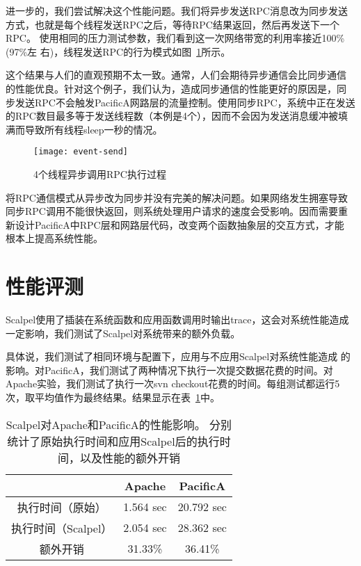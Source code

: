 进一步的，我们尝试解决这个性能问题。我们将异步发送RPC消息改为同步发送
方式，也就是每个线程发送RPC之后，等待RPC结果返回，然后再发送下一个RPC。
使用相同的压力测试参数，我们看到这一次网络带宽的利用率接近100\%(97\%左
右)，线程发送RPC的行为模式如图~\ref{fig:event-send}所示。

这个结果与人们的直观预期不太一致。通常，人们会期待异步通信会比同步通信
的性能优良。针对这个例子，我们认为，造成同步通信的性能更好的原因是，同
步发送RPC不会触发PacificA网路层的流量控制。使用同步RPC，系统中正在发送
的RPC数目最多等于发送线程数（本例是4个），因而不会因为发送消息缓冲被填
满而导致所有线程sleep一秒的情况。

\begin{figure}
  \centering
  \begin{minipage}{0.8\linewidth}
    \centering
    \texttt{[image: event-send]}
    \caption{4个线程异步调用RPC执行过程}
    \label{fig:event-send}
  \end{minipage}
\end{figure}

将RPC通信模式从异步改为同步并没有完美的解决问题。如果网络发生拥塞导致
同步RPC调用不能很快返回，则系统处理用户请求的速度会受影响。因而需要重
新设计PacificA中RPC层和网路层代码，改变两个函数抽象层的交互方式，才能
根本上提高系统性能。


\section{性能评测}
\label{sec:scp:perf}

Scalpel使用了插装在系统函数和应用函数调用时输出trace，这会对系统性能造成
一定影响，我们测试了Scalpel对系统带来的额外负载。

具体说，我们测试了相同环境与配置下，应用与不应用Scalpel对系统性能造成
的影响。对PacificA，我们测试了两种情况下执行一次提交数据花费的时间。对
Apache实验，我们测试了执行一次svn checkout花费的时间。每组测试都运行5
次，取平均值作为最终结果。结果显示在表~\ref{fig:perf}中。

\begin{table}[t!]
\small
\centering
\begin{minipage}{0.8\linewidth}
\centering
\caption{Scalpel对Apache和PacificA的性能影响。
分别统计了原始执行时间和应用Scalpel后的执行时间，以及性能的额外开销}
\label{fig:perf}
\begin{tabular}{ccc}

\toprule[1.5pt]
  		& Apache	& PacificA \\
\midrule[1pt]
执行时间（原始）& 1.564 sec	& 20.792 sec \\
执行时间（Scalpel）& 2.054 sec	& 28.362 sec \\
额外开销	& 31.33\%       & 36.41\% \\
\bottomrule[1.5pt]
\end{tabular}
\end{minipage}
\end{table}

